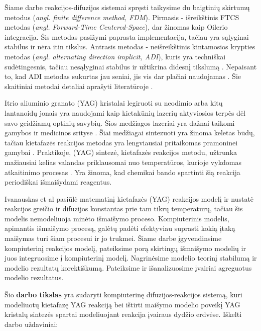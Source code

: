 Šiame darbe reakcijos-difuzijos sistemai spręsti taikysime du baigtinių skirtumų metodus (\textit{angl. finite difference method, FDM}). Pirmasis - išreikštinis FTCS metodas (\textit{angl. Forward-Time Centered-Space}), dar žinomas kaip Oilerio integracija. Šis metodas pasižymi paprasta implementacija, tačiau yra sąlyginai stabilus ir nėra itin tikslus. Antrasis metodas - neišreikštinis kintamosios krypties metodas (\textit{angl. alternating direction implicit, ADI}), kuris yra techniškai sudėtingesnis, tačiau nesąlyginai stabilus ir užtikrina didesnį tikslumą \cite{doi:10.1137/0103003}. Nepaisant to, kad ADI metodas sukurtas jau seniai, jis vis dar plačiai naudojamas \cite{gaidamauskaiteComparisonFiniteDifference2007}. Šie skaitiniai metodai detaliai aprašyti literatūroje \cite{pressNumericalRecipes3rd2007,levequeFiniteDifferenceMethods2007}.

Itrio aliuminio granato (YAG) kristalai legiruoti su neodimio arba kitų lantanoidų jonais yra naudojami kaip kietakūnių lazerių aktyviosios terpės dėl savo geidžiamų optinių savybių. Šios medžiagos lazeriai yra dažnai taikomi gamybos ir medicinos srityse \cite{dubeyExperimentalStudyNd2008, valentiUseErYAG2021}. Šiai medžiagai sintezuoti yra žinoma keletas būdų, tačiau kietafazės reakcijos metodas yra lengviausiai pritaikomas pramoninei gamybai \cite{bhattacharyyaMethodsSynthesisY3AI5O122007, zhangNovelSynthesisYAG2005}. Praktikoje, (YAG) sintezė, kietafazės reakcijos metodu, užtrunka mažiausiai kelias valandas priklausomai nuo temperatūros, kurioje vykdomas atkaitinimo procesas \cite{mackeviciusCloserLookComputer2012}. Yra žinoma, kad chemikai bando spartinti šią reakcija periodiškai išmaišydami reagentus.

Ivanauskas et al \cite{ivanauskasModellingSolidState2005} pasiūlė matematinį kietafazės (YAG) reakcijos modelį ir nustatė reakcijos greičio ir difuzijos konstantas prie tam tikrų temperatūrų, tačiau šis modelis nemodeliuoja minėto išmaišymo proceso. Kompiuterinis modelis, apimantis išmaišymo procesą, galėtų padėti efektyviau suprasti kokią įtaką maišymas turi šiam procesui ir jo trukmei. Šiame darbe įgyvendinsime kompiuterinį reakcijos modelį, pateiksime porą skirtingų išmaišymo modelių ir juos integruosime į kompiuterinį modelį. Nagrinėsime modelio teorinį stabilumą ir modelio rezultatų korektiškumą. Pateiksime ir išanalizuosime įvairiai agreguotus modelio rezultatus.

Šio \textbf{darbo tikslas} yra sudaryti kompiuterinę difuzijos-reakcijos sistemą, kuri modeliuotų kietafazę YAG reakciją bei ištirti maišymo modelio poveikį YAG kristalų sintezės spartai modeliuojant reakcija įvairaus dydžio erdvėse. Iškelti darbo uždaviniai:


